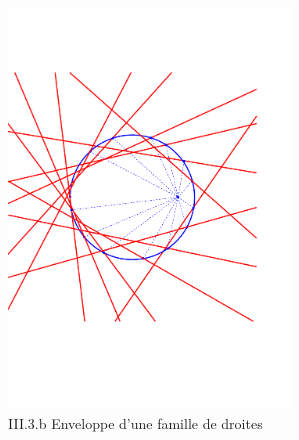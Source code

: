 \begin{figure}[ht]
 \centering
 \includegraphics[width=7.5cm]{Cconi2_7.pdf}
\caption{III.3.b Enveloppe d'une famille de droites}
\label{fig:Cconi2_7}
\end{figure}
